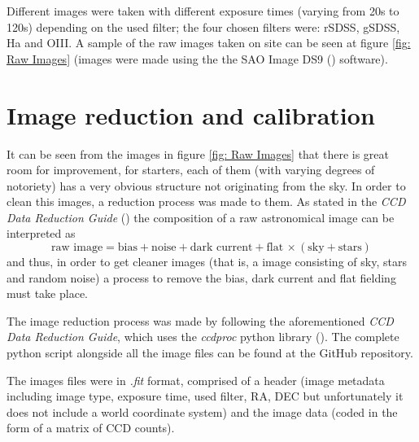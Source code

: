 \documentclass{aa}
\begin{document}
    Different images were taken with different exposure times (varying from 20s to 120s) depending on the used filter; the four chosen filters were: rSDSS, gSDSS, Ha and OIII. A sample of the raw images taken on site can be seen at figure \ref{fig: Raw  Images} (images were made using the the SAO Image DS9 (\cite{DS9}) software).

    
    \section{Image reduction and calibration}\label{sec: Image reduction and calibration}
    It can be seen from the images in figure \ref{fig: Raw  Images} that there is great room for improvement, for starters, each of them (with varying degrees of notoriety) has a very obvious structure not originating from the sky. In order to clean this images, a reduction process was made to them.  As stated in the \textit{CCD Data Reduction Guide} (\cite{CCD_Guide}) the composition of a raw astronomical image can be interpreted as
    \begin{equation}
        \text{raw image} =\text{bias}+\text{noise}+\text{dark current}+\text{flat}\,\times\left(\text{sky}+\text{stars}\right)
    \end{equation}
    and thus, in order to get cleaner images (that is, a image consisting of sky, stars and random noise) a process to remove the bias, dark current and flat fielding must take place.
    
    The image reduction process was made by following the aforementioned \textit{CCD Data Reduction Guide}, which uses the \textit{ccdproc} python library (\cite{Python}). The complete python script alongside all the image files can be found at the \cite{GitHub} GitHub repository.

    The images files were in \textit{.fit} format, comprised of a header (image metadata including image type, exposure time, used filter, RA, DEC but unfortunately it does not include a world coordinate system) and the image data (coded in the form of a matrix of CCD counts). 
\end{document}
